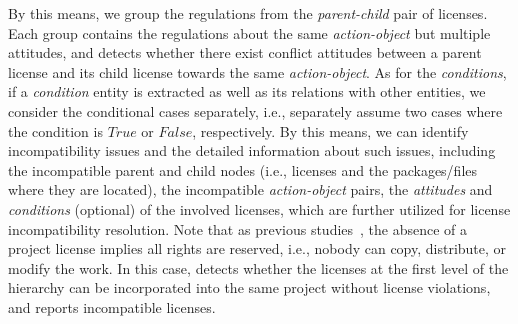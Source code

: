 By this means, we group the regulations from the \textit{parent-child} pair of licenses. Each group contains the regulations about the same \textit{action-object} but multiple attitudes, and \tool detects whether there exist conflict attitudes between a parent license and its child license towards the same \textit{action-object}.
As for the \textit{conditions}, if a \textit{condition} entity is extracted as well as its relations with other entities, we consider the conditional cases separately, i.e., separately assume two cases where the condition is $True$ or $False$, respectively. %
{By this means, we can identify incompatibility issues and the detailed information about such issues, including the incompatible parent and child nodes (i.e., licenses and the packages/files where they are located), the incompatible \textit{action-object} pairs, the \textit{attitudes} and \textit{conditions} (optional) of the involved licenses, which are further utilized for license incompatibility resolution.} Note that as previous studies~\cite{url-choosealicense,xu2021lidetector}, the absence of a project license implies all rights are reserved, i.e., nobody can copy, distribute, or modify the work. In this case, \tool detects whether the licenses at the first level of the hierarchy can be incorporated into the same project without license violations, and reports incompatible licenses.

